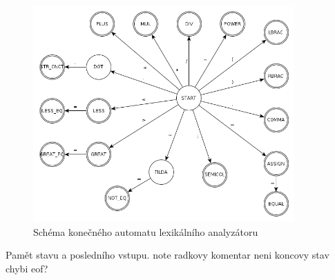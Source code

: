 \begin{figure}
\centering
\includegraphics[width=10cm]{operator.png}
\caption{Schéma konečného automatu lexikálního analyzátoru}
\label{lex.ope}
\end{figure}

Pamět stavu a posledního vstupu.
note radkovy komentar neni koncovy stav
chybi eof?





